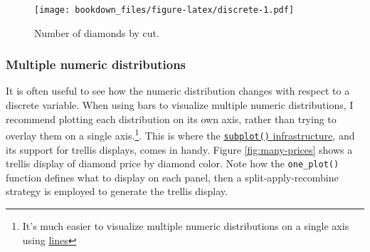 \documentclass[12pt,]{isuthesis}
\newenvironment{Shaded}{\begin{snugshade}}{\end{snugshade}}
\newcommand{\KeywordTok}[1]{\textcolor[rgb]{0.13,0.29,0.53}{\textbf{{#1}}}}
\newcommand{\DataTypeTok}[1]{\textcolor[rgb]{0.13,0.29,0.53}{{#1}}}
\newcommand{\StringTok}[1]{\textcolor[rgb]{0.31,0.60,0.02}{{#1}}}
\newcommand{\NormalTok}[1]{{#1}}
\let\rmarkdownfootnote\footnote%
\def\footnote{\protect\rmarkdownfootnote}
\begin{document}
\begin{Shaded}
\end{Shaded}

\begin{figure}[htbp]
\centering
\texttt{[image: bookdown\_files/figure-latex/discrete-1.pdf]}
\caption{\label{fig:discrete}Number of diamonds by cut.}
\end{figure}

\subsubsection{Multiple numeric
distributions}\label{multiple-numeric-distributions}

It is often useful to see how the numeric distribution changes with
respect to a discrete variable. When using bars to visualize multiple
numeric distributions, I recommend plotting each distribution on its own
axis, rather than trying to overlay them on a single axis.\footnote{It's
  much easier to visualize multiple numeric distributions on a single
  axis using \protect\hyperlink{lines}{lines}}. This is where the
\protect\hyperlink{subplot}{\texttt{subplot()} infrastructure}, and its
support for trellis displays, comes in handy. Figure
\ref{fig:many-prices} shows a trellis display of diamond price by
diamond color. Note how the \texttt{one\_plot()} function defines what
to display on each panel, then a split-apply-recombine strategy is
employed to generate the trellis display.
\end{document}
